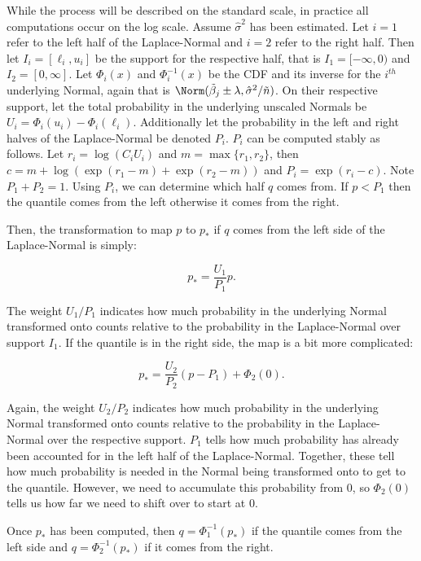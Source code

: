 While the process will be described on the standard scale, in practice all computations occur on the log scale. Assume $\hat{\sigma}^2$ has been estimated. Let $i = 1$ refer to the left half of the Laplace-Normal and $i = 2$ refer to the right half. Then let $I_i = [\ell_i, u_i]$ be the support for the respective half, that is $I_1=[-\infty,0)$ and $I_2=[0,\infty]$. Let $\Phi_i(x)$ and $\Phi_i^{-1}(x)$ be the CDF and its inverse for the $i^{th}$ underlying Normal, again that is $\Norm(\tilde{\beta}_j \pm \lambda, \hat{\sigma}^2 / \tilde{n})$. On their respective support, let the total probability in the underlying unscaled Normals be $U_i = \Phi_i(u_i) - \Phi_i(\ell_i)$. Additionally let the probability in the left and right halves of the Laplace-Normal be denoted $P_i$. $P_i$ can be computed stably as follows. Let $r_i = \log(C_iU_i)$ and $m = \max\{r_1, r_2\}$, then $c = m + \log(\exp(r_1 - m) + \exp(r_2 - m))$ and $P_i = \exp(r_i - c)$. Note $P_1 + P_2 = 1$. Using $P_i$, we can determine which half $q$ comes from. If $p < P_1$ then the quantile comes from the left otherwise it comes from the right.

Then, the transformation to map $p$ to $p_*$ if $q$ comes from the left side of the Laplace-Normal is simply: 

$$
p_* = \frac{U_{1}}{P_{1}}p.
$$

The weight $U_{1} / P_{1}$ indicates how much probability in the underlying Normal transformed onto counts relative to the probability in the Laplace-Normal over support $I_1$. If the quantile is in the right side, the map is a bit more complicated:

$$
p_* = \frac{U_{2}}{P_{2}} (p - P_1) + \Phi_{2}(0).
$$

Again, the weight $U_{2} / P_{2}$ indicates how much probability in the underlying Normal transformed onto counts relative to the probability in the Laplace-Normal over the respective support. $P_1$ tells how much probability has already been accounted for in the left half of the Laplace-Normal. Together, these tell how much probability is needed in the Normal being transformed onto to get to the quantile. However, we need to accumulate this probability from $0$, so $\Phi_{2}(0)$ tells us how far we need to shift over to start at $0$. 

Once $p_*$ has been computed, then $q = \Phi_1^{-1}(p_*)$ if the quantile comes from the left side and $q = \Phi_2^{-1}(p_*)$ if it comes from the right.

